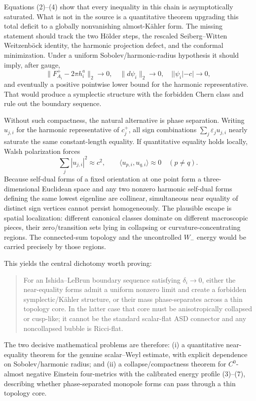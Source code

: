 Equations (2)--(4) show that every inequality in this chain is asymptotically saturated.  What is not in the source is a quantitative theorem upgrading this total deficit to a globally nonvanishing almost-K\"ahler form.  The missing statement should track the two H\"older steps, the rescaled Seiberg--Witten Weitzenb\"ock identity, the harmonic projection defect, and the conformal minimization.  Under a uniform Sobolev/harmonic-radius hypothesis it should imply, after gauge,
\[
 \|F_{A_i}^+-2\pi h_i^{a}\|_2\to0,
 \quad \|d\psi_i\|_2\to0,
 \quad ||\psi_i|-c|\to0,
\]
and eventually a positive pointwise lower bound for the harmonic representative.  That would produce a symplectic structure with the forbidden Chern class and rule out the boundary sequence.

Without such compactness, the natural alternative is phase separation.  Writing \(u_{j,i}\) for the harmonic representative of \(c_j^+\), all sign combinations
\(\sum_j\varepsilon_ju_{j,i}\) nearly saturate the same constant-length equality.  If quantitative equality holds locally, Walsh polarization forces
\[
 \sum_j|u_{j,i}|^2\approx c^2,
 \qquad \langle u_{p,i},u_{q,i}\rangle\approx0\quad(p\ne q).
\]
Because self-dual forms of a fixed orientation at one point form a three-dimensional Euclidean space and any two nonzero harmonic self-dual forms defining the same lowest eigenline are collinear, simultaneous near equality of distinct sign vertices cannot persist homogeneously.  The plausible escape is spatial localization: different canonical classes dominate on different macroscopic pieces, their zero/transition sets lying in collapsing or curvature-concentrating regions.  The connected-sum topology and the uncontrolled \(W_-\) energy would be carried precisely by those regions.

This yields the central dichotomy worth proving:
\begin{quote}
For an Ishida--LeBrun boundary sequence satisfying \(\delta_i\to0\), either the near-equality forms admit a uniform nonzero limit and create a forbidden symplectic/K\"ahler structure, or their mass phase-separates across a thin topology core.  In the latter case that core must be anisotropically collapsed or cusp-like; it cannot be the standard scalar-flat ASD connector and any noncollapsed bubble is Ricci-flat.
\end{quote}

The two decisive mathematical problems are therefore: (i) a quantitative near-equality theorem for the genuine scalar--Weyl estimate, with explicit dependence on Sobolev/harmonic radius; and (ii) a collapse/compactness theorem for \(C^0\)-almost negative Einstein four-metrics with the calibrated energy profile (3)--(7), describing whether phase-separated monopole forms can pass through a thin topology core.

